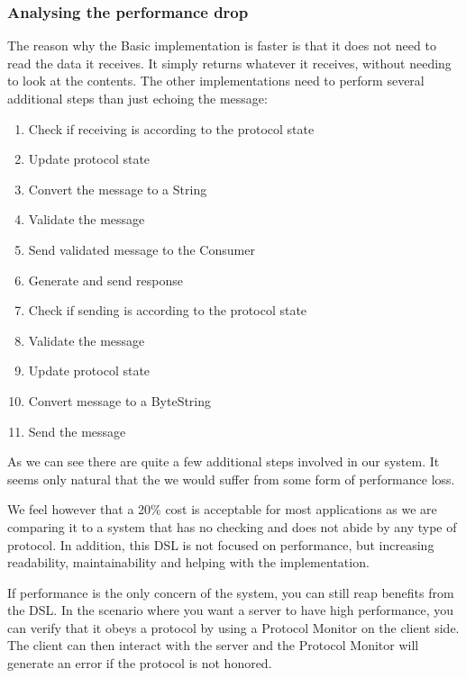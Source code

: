 \subsubsection{Analysing the performance drop}
The reason why the Basic implementation is faster is that it does not need to read the data it receives. It simply returns whatever it receives, without needing to look at the contents. The other implementations need to perform several additional steps than just echoing the message:
\begin{enumerate}
  \item Check if receiving is according to the protocol state
  \item Update protocol state
  \item Convert the message to a String 
  \item Validate the message
  \item Send validated message to the Consumer
  \item Generate and send response
  \item Check if sending is according to the protocol state
  \item Validate the message
  \item Update protocol state
  \item Convert message to a ByteString
  \item Send the message
\end{enumerate}
As we can see there are quite a few additional steps involved in our system. It seems only natural that the we would suffer from some form of performance loss.

We feel however that a 20\% cost is acceptable for most applications as we are comparing it to a system that has no checking and does not abide by any type of protocol. In addition, this DSL is not focused on performance, but increasing readability, maintainability and helping with the implementation.

If performance is the only concern of the system, you can still reap benefits from the DSL. In the scenario where you want a server to have high performance, you can verify that it obeys a protocol by using a Protocol Monitor on the client side. The client can then interact with the server and the Protocol Monitor will generate an error if the protocol is not honored.  


